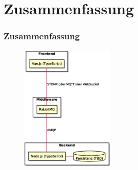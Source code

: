 \section{Zusammenfassung}
\begin{frame}
    \frametitle{Zusammenfassung}
    \begin{figure}
        \centering
        \includegraphics[height=6cm]{media/Technologien.eps}
    \end{figure}
\end{frame}